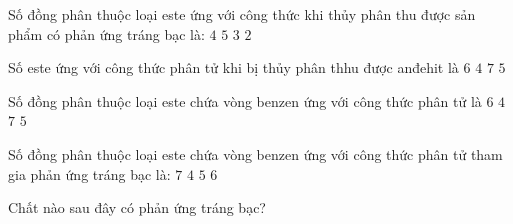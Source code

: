 \begin{vdex}
	Số đồng phân thuộc loại este ứng với công thức  khi thủy phân thu được sản phẩm có phản ứng tráng bạc là:
	\choice
	{%
		\True $ 4 $
	}
	{%
		$ 5 $
	}
	{%
		$ 3 $
	}
	{%
		$ 2 $
	}
		\huongdan{%
		
	}
\end{vdex}



\begin{vdex}
	Số este ứng với công thức phân tử  khi bị thủy phân thhu được anđehit là
	\choice
	{%
		\True $ 6 $
	}
	{%
		$ 4 $
	}
	{%
		$ 7 $
	}
	{%
		$ 5 $
	}
		\huongdan{%
		
	}
\end{vdex}

\begin{vdex}
	Số đồng phân thuộc loại este chứa vòng benzen ứng với công thức phân tử  là
	\choice
	{%
		\True $ 6 $
	}
	{%
		$ 4 $
	}
	{%
		$ 7 $
	}
	{%
		$ 5 $
	}
		\huongdan{%
		
	}
\end{vdex}


\begin{vdex}
	Số đồng phân thuộc loại este chứa vòng benzen ứng với công thức phân tử  tham gia phản ứng tráng bạc là:
	\choice
	{%
		 $ 7 $
	}
	{%
	\True	$ 4 $
	}
	{%
		$ 5 $
	}
	{%
		$ 6 $
	}
		\huongdan{%
		
	}
\end{vdex}

\begin{vdex}
	Chất nào sau đây có phản ứng tráng bạc?
	\choice
	{%
	}
	{%
	}
	{%
		\True {}
	}
	{%
	}
		\huongdan{%
		
	}
\end{vdex}

